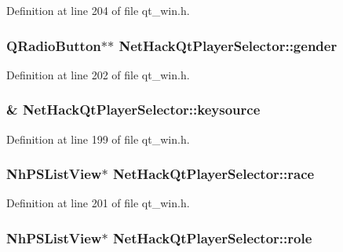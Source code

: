 Definition at line 204 of file qt\+\_\+win.\+h.

\hypertarget{classNetHackQtPlayerSelector_a275924ce70d6e47c65ea30bb86e25c5b}{
\subsubsection[{gender}]{\setlength{\rightskip}{0pt plus 5cm}Q\+Radio\+Button$\ast$$\ast$ Net\+Hack\+Qt\+Player\+Selector\+::gender\hspace{0.3cm}{\ttfamily [private]}}}\label{classNetHackQtPlayerSelector_a275924ce70d6e47c65ea30bb86e25c5b}


Definition at line 202 of file qt\+\_\+win.\+h.

\hypertarget{classNetHackQtPlayerSelector_a62e65e128d1b599d43ae2e3b2ba1704f}{
\subsubsection[{keysource}]{\& Net\+Hack\+Qt\+Player\+Selector\+::keysource\hspace{0.3cm}{\ttfamily [private]}}}\label{classNetHackQtPlayerSelector_a62e65e128d1b599d43ae2e3b2ba1704f}


Definition at line 199 of file qt\+\_\+win.\+h.

\hypertarget{classNetHackQtPlayerSelector_a04b1f079d0191713b83d87a15ece945d}{
\subsubsection[{race}]{\setlength{\rightskip}{0pt plus 5cm}Nh\+P\+S\+List\+View$\ast$ Net\+Hack\+Qt\+Player\+Selector\+::race\hspace{0.3cm}{\ttfamily [private]}}}\label{classNetHackQtPlayerSelector_a04b1f079d0191713b83d87a15ece945d}


Definition at line 201 of file qt\+\_\+win.\+h.

\hypertarget{classNetHackQtPlayerSelector_ae78e6cfd7a34b808d67d9bb01605a6c1}{
\subsubsection[{role}]{\setlength{\rightskip}{0pt plus 5cm}Nh\+P\+S\+List\+View$\ast$ Net\+Hack\+Qt\+Player\+Selector\+::role\hspace{0.3cm}{\ttfamily [private]}}}\label{classNetHackQtPlayerSelector_ae78e6cfd7a34b808d67d9bb01605a6c1}



